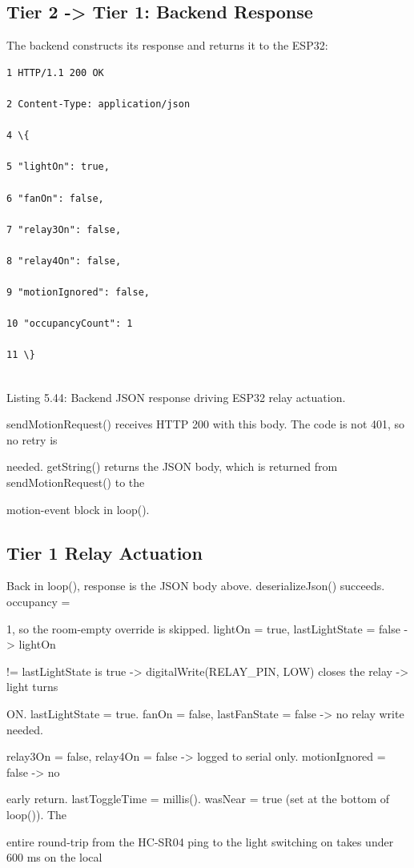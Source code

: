 \subsection{Tier 2 -> Tier 1: Backend Response}
The backend constructs its response and returns it to the ESP32:

\begin{listingbox}
	\begin{verbatim}
1 HTTP/1.1 200 OK

2 Content-Type: application/json

4 \{

5 "lightOn": true,

6 "fanOn": false,

7 "relay3On": false,

8 "relay4On": false,

9 "motionIgnored": false,

10 "occupancyCount": 1

11 \}


\end{verbatim}
\end{listingbox}
Listing 5.44: Backend JSON response driving ESP32 relay actuation.

sendMotionRequest() receives HTTP 200 with this body. The code is not 401, so no retry is

needed. getString() returns the JSON body, which is returned from sendMotionRequest() to the

motion-event block in loop().


\subsection{Tier 1  Relay Actuation}
Back in loop(), response is the JSON body above. deserializeJson() succeeds. occupancy =

1, so the room-empty override is skipped. lightOn = true, lastLightState = false -> lightOn

!= lastLightState is true -> digitalWrite(RELAY\_PIN, LOW) closes the relay -> light turns

ON. lastLightState = true. fanOn = false, lastFanState = false -> no relay write needed.

relay3On = false, relay4On = false -> logged to serial only. motionIgnored = false -> no

early return. lastToggleTime = millis(). wasNear = true (set at the bottom of loop()). The

entire round-trip from the HC-SR04 ping to the light switching on takes under 600 ms on the local


